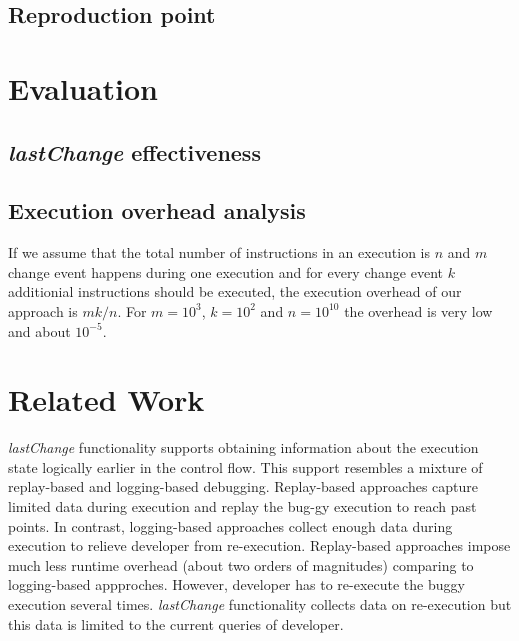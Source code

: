\documentclass[preprint]{sigplanconf}
\begin{document}
\subsection{Reproduction point}

\section{Evaluation}
\subsection{\textit{lastChange} effectiveness}

\subsection{Execution overhead analysis}
If we assume that the total number of instructions in an execution is $n$ and $m$ change event happens during one execution and for every change event $k$ additionial instructions should be executed, the execution overhead of our approach is $mk/n$. For $m=10^3$, $k=10^2$ and $n=10^{10}$ the overhead is very low and about $10^{-5}$.

\section{Related Work}

\textit{lastChange} functionality supports obtaining information about the execution state logically earlier in the control flow. This support resembles a mixture of replay-based and logging-based debugging. Replay-based approaches capture limited data during execution and replay the bug-gy execution to reach past points. In contrast, logging-based approaches collect enough data during execution to relieve developer from re-execution. Replay-based approaches impose much less runtime overhead (about two orders of magnitudes) comparing to logging-based appproches. However, developer has to re-execute the buggy execution several times. \textit{lastChange} functionality collects data on re-execution but this data is limited to the current queries of developer.
\end{document}
